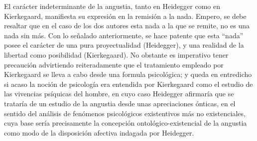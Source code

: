 \documentclass[]{article}
\begin{document}
El carácter indeterminante de la angustia, tanto en Heidegger como en Kierkegaard, manifiesta su expresión en la remisión a la nada. Empero, se debe resaltar que en el caso de los dos autores esta nada a la que se remite, no es una nada sin más. Con lo señalado anteriormente, se hace patente que esta ``nada'' posee el carácter de una pura proyectualidad (Heidegger), y una realidad de la libertad como posibilidad (Kierkegaard). No obstante es imperativo tener precaución advirtiendo reiteradamente que el tratamiento empleado por Kierkegaard se lleva a cabo desde una formula psicológica; y queda en entredicho si acaso la noción de psicología era entendida por Kierkegaard como el estudio de las vivencias psíquicas del hombre, en cuyo caso Heidegger afirmaría que se trataría de un estudio de la angustia desde unas apreciaciones ónticas, en el sentido del análisis de fenómenos psicológicos existentivos más no existenciales, cuya base sería precisamente la concepción ontológico-existencial de la angustia como modo de la disposición afectiva indagada por Heidegger.
\end{document}
